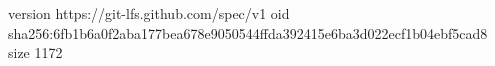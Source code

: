 version https://git-lfs.github.com/spec/v1
oid sha256:6fb1b6a0f2aba177bea678e9050544ffda392415e6ba3d022ecf1b04ebf5cad8
size 1172
